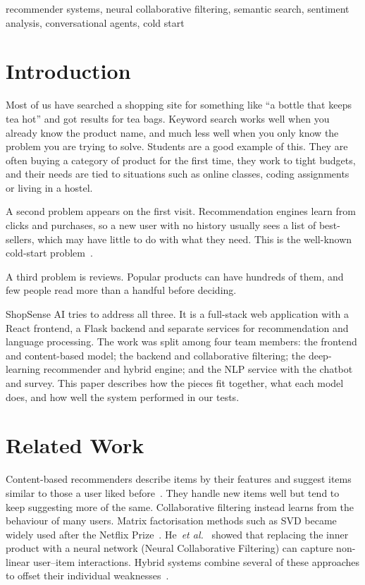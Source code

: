 \documentclass[conference]{IEEEtran}
\begin{document}
\begin{IEEEkeywords}
recommender systems, neural collaborative filtering, semantic search, sentiment analysis, conversational agents, cold start
\end{IEEEkeywords}

\section{Introduction}
Most of us have searched a shopping site for something like ``a bottle that keeps tea hot'' and got results for tea bags. Keyword search works well when you already know the product name, and much less well when you only know the problem you are trying to solve. Students are a good example of this. They are often buying a category of product for the first time, they work to tight budgets, and their needs are tied to situations such as online classes, coding assignments or living in a hostel.

A second problem appears on the first visit. Recommendation engines learn from clicks and purchases, so a new user with no history usually sees a list of best-sellers, which may have little to do with what they need. This is the well-known cold-start problem~\cite{schein2002}.

A third problem is reviews. Popular products can have hundreds of them, and few people read more than a handful before deciding.

ShopSense AI tries to address all three. It is a full-stack web application with a React frontend, a Flask backend and separate services for recommendation and language processing. The work was split among four team members: the frontend and content-based model; the backend and collaborative filtering; the deep-learning recommender and hybrid engine; and the NLP service with the chatbot and survey. This paper describes how the pieces fit together, what each model does, and how well the system performed in our tests.

\section{Related Work}
Content-based recommenders describe items by their features and suggest items similar to those a user liked before~\cite{lops2011}. They handle new items well but tend to keep suggesting more of the same. Collaborative filtering instead learns from the behaviour of many users. Matrix factorisation methods such as SVD became widely used after the Netflix Prize~\cite{koren2009}. He~\textit{et al.}~\cite{he2017} showed that replacing the inner product with a neural network (Neural Collaborative Filtering) can capture non-linear user--item interactions. Hybrid systems combine several of these approaches to offset their individual weaknesses~\cite{burke2002}.
\end{document}
